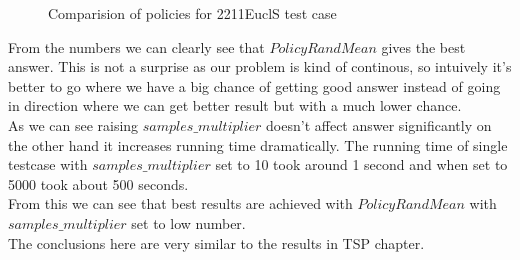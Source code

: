 \begin{figure}[ht]
  
  \caption{Comparision of policies for 2211EuclS test case}
\end{figure}
\FloatBarrier

From the numbers we can clearly see that $PolicyRandMean$ gives the best answer.
This is not a surprise as our problem is kind of continous, so intuively it's better
to go where we have a big chance of getting good answer instead of going in direction
where we can get better result but with a much lower chance. \\
As we can see raising $samples\_multiplier$ doesn't affect answer significantly on the other hand
it increases running time dramatically. The running time of single testcase with $samples\_multiplier$
set to 10 took around 1 second and when set to 5000 took about 500 seconds. \\
From this we can see that best results are achieved with $PolicyRandMean$ with $samples\_multiplier$ set to low number. \\
The conclusions here are very similar to the results in TSP chapter. 
